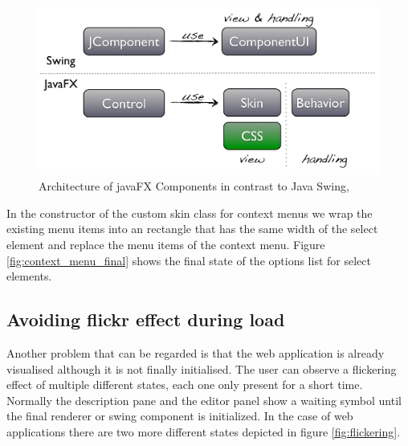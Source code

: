 \begin{figure}
	\centering \includegraphics[width=1.0\textwidth]{./img/impl/fx_components.png}
	\caption{Architecture of javaFX Components in contrast to Java Swing, \autocite{impl:fx-ui-controls}}
	\label{fig:fx-skinning}
\end{figure}

In the constructor of the custom skin class for context menus we wrap the existing menu items into an rectangle that has the same width of the select element and replace the menu items of the context menu. 
Figure \ref{fig:context_menu_final} shows the final state of the options list for select elements.

\subsection{ Avoiding flickr effect during load}

Another problem that can be regarded is that the web application is already visualised although it is not finally initialised.
The user can observe a flickering effect of multiple different states, each one only present for a short time. 
Normally the description pane and the editor panel show a waiting symbol until the final renderer or swing component is initialized. 
In the case of web applications there are two more different states depicted in figure \ref{fig:flickering}.

